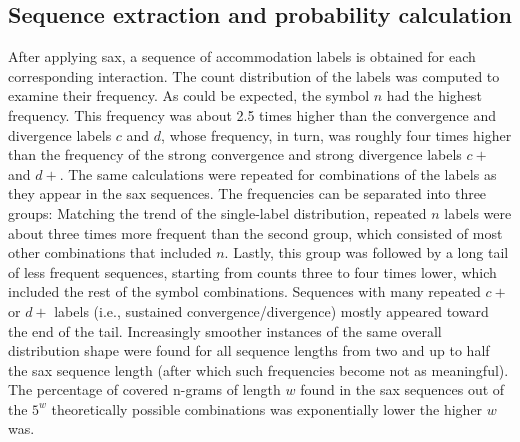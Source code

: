 \subsection{Sequence extraction and probability calculation}
\label{subsec:word_extraction_and_seq_prob}

After applying \ac{sax}, a sequence of accommodation labels is obtained for each corresponding interaction.
The count distribution of the labels was computed to examine their frequency.
As could be expected, the symbol $n$ had the highest frequency.
This frequency was about 2.5 times higher than the convergence and divergence labels $c$ and $d$, whose frequency, in turn, was roughly four times higher than the frequency of the strong convergence and strong divergence labels $c+$ and $d+$.
The same calculations were repeated for combinations of the labels as they appear in the \ac{sax} sequences.
The frequencies can be separated into three groups:
Matching the trend of the single-label distribution, repeated $n$ labels were about three times more frequent than the second group, which consisted of most other combinations that included $n$.
Lastly, this group was followed by a long tail of less frequent sequences, starting from counts three to four times lower, which included the rest of the symbol combinations.
Sequences with many repeated $c+$ or $d+$ labels (i.e., sustained convergence/divergence) mostly appeared toward the end of the tail.
Increasingly smoother instances of the same overall distribution shape were found for all sequence lengths from two and up to half the \ac{sax} sequence length (after which such frequencies become not as meaningful).
The percentage of covered n-grams of length $w$ found in the \ac{sax} sequences out of the $5^w$ theoretically possible combinations was exponentially lower the higher $w$ was.

